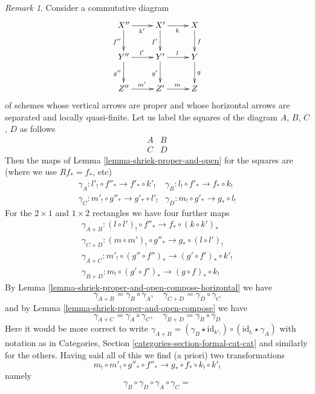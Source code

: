 \documentclass{stacks-project}
\theoremstyle{plain}
\theoremstyle{definition}
\theoremstyle{remark}
\newtheorem{remark}[subsection]{Remark}
\numberwithin{equation}{subsection}
\begin{document}
\begin{remark}
\label{remark-going-around}
Consider a commutative diagram
$$
\xymatrix{
X'' \ar[r]_{k'} \ar[d]_{f''} & X' \ar[r]_k \ar[d]_{f'} & X \ar[d]^f \\
Y'' \ar[r]^{l'} \ar[d]_{g''} & Y' \ar[r]^l \ar[d]_{g'} & Y \ar[d]^g \\
Z'' \ar[r]^{m'} & Z' \ar[r]^m & Z
}
$$
of schemes whose vertical arrows are proper and whose horizontal
arrows are separated and locally quasi-finite.
Let us label the squares of the diagram $A$, $B$, $C$, $D$
as follows
$$
\begin{matrix}
A & B \\
C & D
\end{matrix}
$$
Then the maps of Lemma \ref{lemma-shriek-proper-and-open}
for the squares are (where we use $Rf_* = f_*$, etc)
$$
\begin{matrix}
\gamma_A : l'_! \circ f''_* \to f'_* \circ k'_! &
\gamma_B : l_! \circ f'_* \to f_* \circ k_! \\
\gamma_C : m'_! \circ g''_* \to g'_* \circ l'_! &
\gamma_D : m_! \circ g'_* \to g_* \circ l_!
\end{matrix}
$$
For the $2 \times 1$ and $1 \times 2$ rectangles we have four further
maps
$$
\begin{matrix}
\gamma_{A + B} :
(l \circ l')_! \circ f''_* \to f_* \circ (k \circ k')_*  \\
\gamma_{C + D} :
(m \circ m')_! \circ g''_* \to g_* \circ (l \circ l')_! \\
\gamma_{A + C} :
m'_! \circ (g'' \circ f'')_* \to (g' \circ f')_* \circ k'_! \\
\gamma_{B + D} :
m_! \circ (g' \circ f')_* \to (g \circ f)_* \circ k_!
\end{matrix}
$$
By Lemma \ref{lemma-shriek-proper-and-open-compose-horizontal} we have
$$
\gamma_{A + B} = \gamma_B \circ \gamma_A, \quad
\gamma_{C + D} = \gamma_D \circ \gamma_C
$$
and by Lemma \ref{lemma-shriek-proper-and-open-compose} we have
$$
\gamma_{A + C} = \gamma_A \circ \gamma_C, \quad
\gamma_{B + D} = \gamma_B \circ \gamma_D
$$
Here it would be more correct to write
$\gamma_{A + B} = (\gamma_B \star \text{id}_{k'_!}) \circ
(\text{id}_{l_!} \star \gamma_A)$ with notation as in
Categories, Section \ref{categories-section-formal-cat-cat}
and similarly for the others.
Having said all of this we find (a priori) two transformations
$$
m_! \circ m'_! \circ g''_* \circ f''_*
\longrightarrow
g_* \circ f_* \circ k_! \circ k'_!
$$
namely
$$
\gamma_B \circ \gamma_D \circ \gamma_A \circ \gamma_C =
$$
\end{remark}
\end{document}
